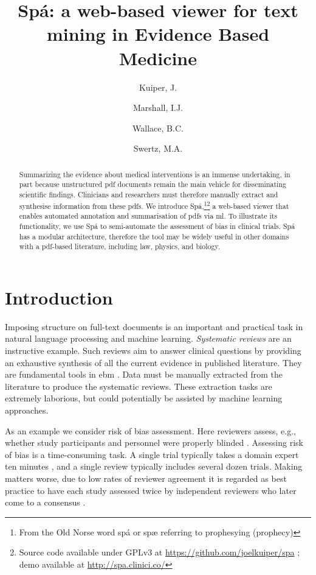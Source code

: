 \documentclass{llncs}
\institute{
  University of Groningen P.O. Box 30001, 9700 RB Groningen \\ \mailsa
  \and King's College London, London SE1 3QD, UK \\ \mailsb
  \and University of Texas at Austin, Austin, TX 78712, USA \\ \mailsc}
\begin{document}
\setcounter{tocdepth}{3}

%
\author{Kuiper, J. \and Marshall, I.J. \and Wallace, B.C. \and Swertz, M.A.}
\title{Spá: a web-based viewer for text mining in Evidence Based Medicine}

\maketitle
\begin{abstract}
Summarizing the evidence about medical interventions is an immense undertaking, in part because unstructured \ac{pdf} documents remain the main vehicle for disseminating scientific findings.
Clinicians and researchers must therefore manually extract and synthesise information from these \acp{pdf}.
We introduce Spá,\footnote{From the Old Norse word spá or spæ referring to prophesying (prophecy)}\footnote{Source code available under GPLv3 at \url{https://github.com/joelkuiper/spa} \cite{Kuiper2014}; demo available at \url{http://spa.clinici.co/}} a web-based viewer that enables automated annotation and summarisation of \acp{pdf} via \acl{ml}.
To illustrate its functionality, we use Spá to semi-automate the assessment of bias in clinical trials.
Spá has a modular architecture, therefore the tool may be widely useful in other domains with a \ac{pdf}-based literature, including law, physics, and biology.

\end{abstract}

\acresetall
{}

\section{Introduction}
\label{section:intro}

Imposing structure on full-text documents is an important and practical task in natural language processing and machine learning.
\emph{Systematic reviews} are an instructive example.
Such reviews aim to answer clinical questions by providing an exhaustive synthesis of all the current evidence in published literature.
They are fundamental tools in \ac{ebm} \cite{Sackett1996,Valkenhoef2012}.
Data must be manually extracted from the literature to produce the systematic reviews.
These extraction tasks are extremely laborious, but could potentially be assisted by machine learning approaches.

As an example we consider risk of bias assessment.
Here reviewers assess, e.g., whether study participants and personnel were properly blinded \cite{Higgins2011}.
Assessing risk of bias is a time-consuming task.
A single trial typically takes a domain expert ten minutes \cite{Hartling2011}, and a single review typically includes several dozen trials.
Making matters worse, due to low rates of reviewer agreement it is regarded as best practice to have each study assessed twice by independent reviewers who later come to a consensus \cite{Hartling2009}.
\end{document}
